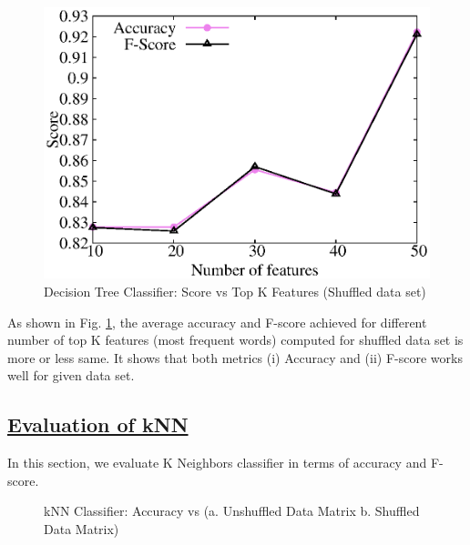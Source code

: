 \documentclass[journal,onecolumn]{IEEEtran}
\begin{document}
\begin{figure}[h]
\begin{center}
 \includegraphics[scale=0.6] {Output/newTree/accuracy_fscore.eps}
 \caption { Decision Tree Classifier: Score vs Top K Features (Shuffled data set)} \label{acc_fscore}
 \end{center}
\end{figure}

As shown in Fig. \ref{acc_fscore}, the average accuracy and F-score achieved for different number of top K features (most frequent words) computed for shuffled data set is more or less same. It shows that both metrics (i) Accuracy and (ii) F-score works well for given data set.

\subsection{\underline{Evaluation of kNN}}
In this section, we evaluate K Neighbors classifier in terms of accuracy and F-score.
\begin{figure}[h]
\begin{center}
\label{thr}
\caption{ kNN Classifier: Accuracy vs (a. Unshuffled Data Matrix  b. Shuffled Data Matrix) }
\end{center}
\end{figure}
\end{document}
